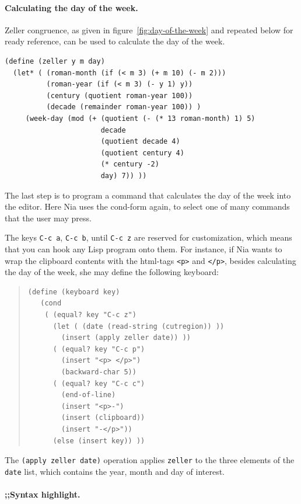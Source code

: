\documentclass[a4paper,12pt]{book}
\begin{document}
\paragraph{Calculating the day of the week.}
Zeller congruence, as given in
figure~\ref{fig:day-of-the-week}
and repeated below 
for ready reference,
can be used to calculate the
day of the week.
\begin{verbatim}
(define (zeller y m day)
  (let* ( (roman-month (if (< m 3) (+ m 10) (- m 2)))
          (roman-year (if (< m 3) (- y 1) y))
          (century (quotient roman-year 100))
          (decade (remainder roman-year 100)) )
     (week-day (mod (+ (quotient (- (* 13 roman-month) 1) 5)
                       decade
                       (quotient decade 4)
                       (quotient century 4)
                       (* century -2)
                       day) 7)) ))
\end{verbatim}

The last step is to program a command
that calculates the day of the week
into the editor. Here Nia uses the
cond-form again, to select one of 
many commands that the user may press.

The keys \verb|C-c a|, \verb|C-c b|,
until \verb|C-c z| are reserved for
customization, which means that you
can hook any Lisp program onto them.
For instance, if Nia wants to wrap
the clipboard contents with the
html-tags \verb|<p>| and \verb|</p>|,
besides calculating the day of 
the week, she may define the
following keyboard:
\begin{quote}
\begin{verbatim}
(define (keyboard key) 
   (cond
    ( (equal? key "C-c z")
      (let ( (date (read-string (cutregion)) ))
        (insert (apply zeller date)) ))
      ( (equal? key "C-c p") 
        (insert "<p> </p>")
        (backward-char 5))
      ( (equal? key "C-c c")
        (end-of-line)
        (insert "<p>-")
        (insert (clipboard))
        (insert "-</p>"))
      (else (insert key)) ))
\end{verbatim}
\end{quote}
The \verb|(apply zeller date)| operation
applies \verb|zeller| 
to the three elements of the  \verb|date| list,
which contains the year, month and day of interest.

\paragraph{;;Syntax highlight.}
\end{document}
